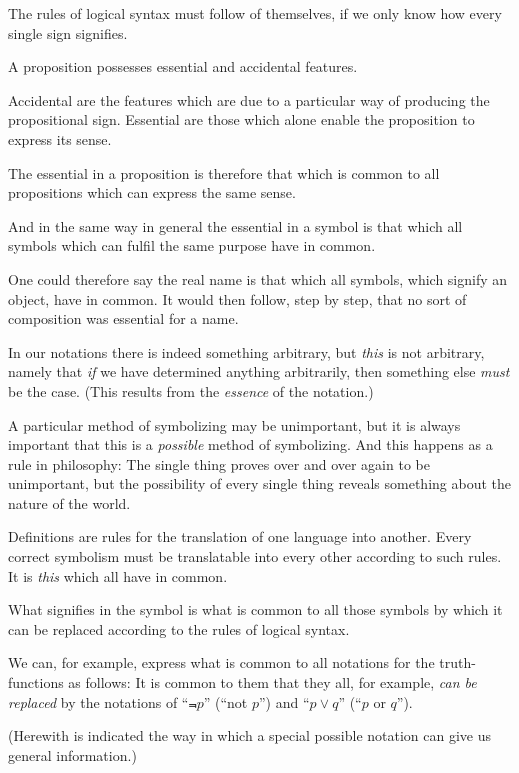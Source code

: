 {The rules of logical syntax must follow of themselves,
if we only know how every single sign
signifies.}


{A proposition possesses essential and accidental
features.

Accidental are the features which are due to a
particular way of producing the propositional sign.
Essential are those which alone enable the proposition
to express its sense.}


{The essential in a proposition is therefore that
which is common to all propositions which can
express the same sense.

And in the same way in general the essential in
a symbol is that which all symbols which can
fulfil the same purpose have in common.}


{One could therefore say the real name is that
which all symbols, which signify an object, have
in common. It would then follow, step by step,
that no sort of composition was essential for a name.}


{In our notations there is indeed something
arbitrary, but \emph{this} is not arbitrary, namely that
\emph{if} we have determined anything arbitrarily, then
something else \emph{must} be the case. (This results
from the \emph{essence} of the notation.)}


{A particular method of symbolizing may be
unimportant, but it is always important that this
is a \emph{possible} method of symbolizing. And this
happens as a rule in philosophy: The single
thing proves over and over again to be unimportant,
but the possibility of every single thing reveals
something about the nature of the world.}


{Definitions are rules for the translation of one
language into another. Every correct symbolism
must be translatable into every other according
to such rules. It is \emph{this} which all have in
common.}
\enlargethispage{-9pt} %


{What signifies in the symbol is what is
common to all those symbols by which it can
be replaced according to the rules of logical
syntax.}


{We can, for example, express what is common to
all notations for the truth-functions as follows: It
is common to them that they all, for example, \emph{can
be replaced} by the notations of ``$\Not{p}$'' (``not $p$'')
and ``$p \lor q$'' (``$p$ or $q$'').

(Herewith is indicated the way in which a special
possible notation can give us general information.)}


